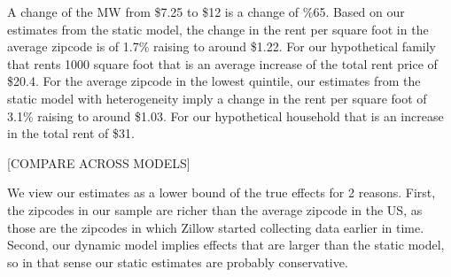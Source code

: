     A change of the MW from \$7.25 to \$12 is a change of \%65. Based on our estimates from the static model, the change in the rent per square foot in the average zipcode is of 1.7\% raising to around \$1.22. For our hypothetical family that rents 1000 square foot that is an average increase of the total rent price of \$20.4. For the average zipcode in the lowest quintile, our estimates from the static model with heterogeneity imply a change in the rent per square foot of 3.1\% raising to around \$1.03. For our hypothetical household that is an increase in the total rent of \$31.
    
    [COMPARE ACROSS MODELS]
    
    We view our estimates as a lower bound of the true effects for 2 reasons. First, the zipcodes in our sample are richer than the average zipcode in the US, as those are the zipcodes in which Zillow started collecting data earlier in time. Second, our dynamic model implies effects that are larger than the static model, so in that sense our static estimates are probably conservative.
